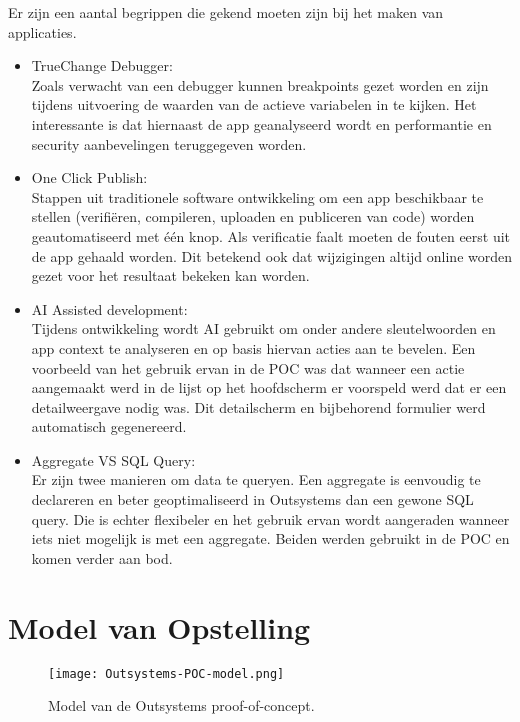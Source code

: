 Er zijn een aantal begrippen die gekend moeten zijn bij het maken van applicaties.
\begin{itemize}
    \item TrueChange Debugger:\\
    Zoals verwacht van een debugger kunnen breakpoints gezet worden en zijn tijdens uitvoering de waarden van de actieve variabelen in te kijken. Het interessante is dat hiernaast de app geanalyseerd wordt en performantie en security aanbevelingen teruggegeven worden.
    \item One Click Publish:\\
    Stappen uit traditionele software ontwikkeling om een app beschikbaar te stellen (verifiëren, compileren, uploaden en publiceren van code) worden geautomatiseerd met één knop. Als verificatie faalt moeten de fouten eerst uit de app gehaald worden.
    Dit betekend ook dat wijzigingen altijd online worden gezet voor het resultaat bekeken kan worden.
    \item AI Assisted development:\\
    Tijdens ontwikkeling wordt AI gebruikt om onder andere sleutelwoorden en app context te analyseren en op basis hiervan acties aan te bevelen. Een voorbeeld van het gebruik ervan in de POC was dat wanneer een actie aangemaakt werd in de lijst op het hoofdscherm er voorspeld werd dat er een detailweergave nodig was. Dit detailscherm en bijbehorend formulier werd automatisch gegenereerd.
    \item Aggregate VS SQL Query:\\
    Er zijn twee manieren om data te queryen. Een aggregate is eenvoudig te declareren en beter geoptimaliseerd in Outsystems dan een gewone SQL query. Die is echter flexibeler en het gebruik ervan wordt aangeraden wanneer iets niet mogelijk is met een aggregate. Beiden werden gebruikt in de POC en komen verder aan bod.
\end{itemize}

\section{Model van Opstelling}

\begin{figure}[h!]
    \centering
    \texttt{[image: Outsystems-POC-model.png]}
    \caption{Model van de Outsystems proof-of-concept.}
    \label{fig:Outsystems-POC-model}
\end{figure}

